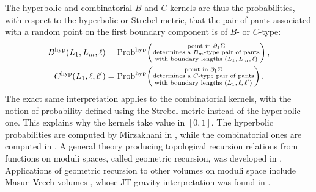\documentclass[a4paper,11pt,english]{article}
\theoremstyle{plain}
\theoremstyle{definition}
\theoremstyle{plain}
\begin{document}
The hyperbolic and combinatorial $B$ and $C$ kernels are thus the probabilities, with respect to the hyperbolic or Strebel metric, that the pair of pants associated with a random point on the first boundary component is of $B$- or $C$-type:
\begin{equation}
\begin{aligned}
    B^{\textup{hyp}}(L_1,L_m,\ell)
    &=
    \mathrm{Prob}^{\textup{hyp}}\!\left(
        \substack{
        \text{point in $\partial_1\Sigma$} \\
        \text{determines a $B_m$-type pair of pants} \\
        \text{with boundary lengths $(L_1,L_m,\ell)$}
        }
    \right), \\
    C^{\textup{hyp}}(L_1,\ell,\ell')
    &=
    \mathrm{Prob}^{\textup{hyp}}\!\left(
        \substack{
        \text{point in $\partial_1\Sigma$} \\
        \text{determines a $C$-type pair of pants} \\
        \text{with boundary lengths $(L_1,\ell,\ell')$}
        }
    \right).
\end{aligned}
\end{equation}
The exact same interpretation applies to the combinatorial kernels, with the notion of probability defined using the Strebel metric instead of the hyperbolic one. This explains why the kernels take value in $[0,1]$. The hyperbolic probabilities are computed by Mirzakhani in \cite{Mir07a}, while the combinatorial ones are computed in \cite{ABCGLW}. A general theory producing topological recursion relations from functions on moduli spaces, called geometric recursion, was developed in \cite{ABO17}. Applications of geometric recursion to other volumes on moduli space include Masur--Veech volumes \cite{Andersen:MV}, whose JT gravity interpretation was found in \cite{Fuji:MV}.

\end{document}
